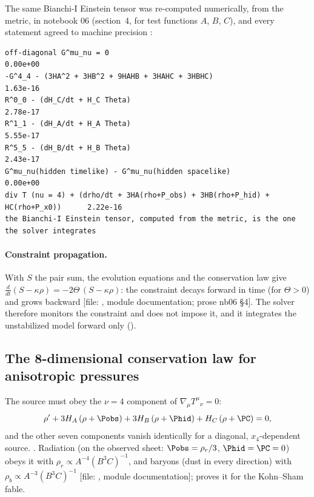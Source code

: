 The same Bianchi-I Einstein tensor was re-computed numerically, from the metric, in notebook 06
(section~4, for test functions $A$, $B$, $C$), and every statement agreed to machine precision
:
\begin{Verbatim}[fontsize=\scriptsize]
off-diagonal G^mu_nu = 0                                                         0.00e+00
-G^4_4 - (3HA^2 + 3HB^2 + 9HAHB + 3HAHC + 3HBHC)                                 1.63e-16
R^0_0 - (dH_C/dt + H_C Theta)                                                    2.78e-17
R^1_1 - (dH_A/dt + H_A Theta)                                                    5.55e-17
R^5_5 - (dH_B/dt + H_B Theta)                                                    2.43e-17
G^mu_nu(hidden timelike) - G^mu_nu(hidden spacelike)                             0.00e+00
div T (nu = 4) + (drho/dt + 3HA(rho+P_obs) + 3HB(rho+P_hid) + HC(rho+P_x0))      2.22e-16
the Bianchi-I Einstein tensor, computed from the metric, is the one the solver integrates
\end{Verbatim}

\paragraph{Constraint propagation.} With $S$ the pair sum, the evolution equations and the conservation
law give $\frac{d}{dt}(S-\kappa\rho)=-2\Theta\,(S-\kappa\rho)$: the constraint decays forward in time
(for $\Theta>0$) and grows backward [file: ,
module documentation; prose nb06 \S4]. The solver therefore monitors the constraint and does not
impose it, and it integrates the unstabilized model forward only ().

\subsection{The 8-dimensional conservation law for anisotropic pressures}
\label{sec:5.5}

The source must obey the $\nu=4$ component of $\nabla_\mu T^\mu{}_\nu=0$:
\[
  \rho'+3H_A\,(\rho+\Pobs)+3H_B\,(\rho+\Phid)+H_C\,(\rho+\PC)=0 ,
\]
and the other seven components vanish identically for a diagonal, $x_4$-dependent source.
 .
Radiation (on the observed sheet: $\Pobs=\rho_r/3$, $\Phid=\PC=0$) obeys it with
$\rho_r\propto A^{-4}(B^3C)^{-1}$, and baryons (dust in every direction) with
$\rho_b\propto A^{-3}(B^3C)^{-1}$ [file: , module
documentation];  proves it for the Kohn--Sham fable.

